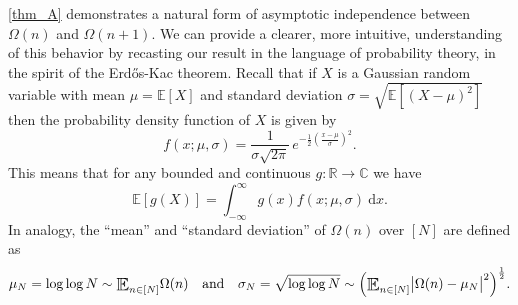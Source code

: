 \documentclass[letter,11pt]{article}
\theoremstyle{plain} %
\theoremstyle{definition} %
\theoremstyle{plain}
\theoremstyle{plain}
\theoremstyle{plain}
\numberwithin{equation}{section}
\newcommand{\Erdos}{Erd\H{o}s}
\newcommand{\R}{\mathbb{R}}
\newcommand{\C}{\mathbb{C}}
\renewcommand{\d}{~\mathrm{d}}
\newcommand{\Esub}[1]{\raisebox{-0.4ex}{\scalebox{1.4}[1.3]{$\mathbb{E}$}}\raisebox{-0.35ex}{\ensuremath{_{\scriptstyle #1}}}}
\newcommand{\1}{\mathbbm{1}}
\begin{document}
\cref{thm_A} demonstrates a natural form of asymptotic independence between $\Omega(n)$ and $\Omega(n+1)$.
We can provide a clearer, more intuitive, understanding of this behavior by recasting our result in the language of probability theory, in the spirit of the \Erdos{}-Kac theorem.
Recall that if $X$ is a Gaussian random variable with mean $\mu=\mathbb{E}[X]$ and standard deviation $\sigma=\sqrt{\mathbb{E}[(X-\mu)^2]}$ then the probability density function of $X$ is given by
\begin{equation}
\label{eqn_Gaussian_prob_dens_fctn}
f(x;\mu,\sigma)= \frac{1}{\sigma\sqrt{2\pi}}\,e^{-\frac{1}{2}\left(\frac{x-\mu}{\sigma}\right)^2}.
\end{equation}
This means that for any bounded and continuous $g\colon \R\to \C$ we have
\begin{equation}
\label{eqn_Gaussian_density_function_characterization}
\mathbb{E}[g(X)] = \int_{-\infty}^\infty g(x)f(x;\mu,\sigma) \d x. 
\end{equation}
In analogy, the ``mean'' and ``standard deviation'' of $\Omega(n)$ over $[N]$ are defined as
\begin{equation}\label{mu_N and sigma_N}
    \mu_N = \log\log{N} \sim \Esub{n\in[N]}\Omega(n)
    \quad\text{and}\quad
     \sigma_N = \sqrt{\log\log{N}} \sim \Big(\Esub{n\in[N]}\big|\Omega(n)-\mu_N\big|^2\Big)^\frac{1}{2}.
\end{equation}
\end{document}
